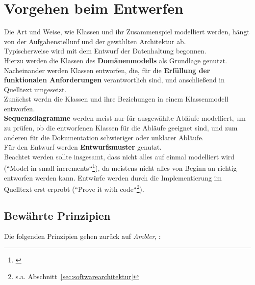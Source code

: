 \section{Vorgehen beim Entwerfen}
Die Art und Weise, wie Klassen und ihr Zusammenspiel modelliert werden, hängt von der Aufgabenstellunf und der gewählten Architektur ab.\\

\noindent
Typischerweise wird mit dem Entwurf der Datenhaltung begonnen.\\
Hierzu werden die Klassen des \textbf{Domänenmodells} als Grundlage genutzt.\\

\noindent
Nacheinander werden Klassen entworfen, die, für die \textbf{Erfüllung der funktionalen Anforderungen} verantwortlich sind, und anschließend in Quelltext umgesetzt.\\

\noindent
Zunächst werdn die Klassen und ihre Beziehungen in einem Klassenmodell entworfen.\\

\noindent
\textbf{Sequenzdiagramme} werden meist nur für ausgewählte Abläufe modelliert, um zu prüfen, ob die entworfenen Klassen für die Abläufe geeignet sind, und zum anderen für die Dokumentation schwieriger oder unklarer Abläufe.\\

\noindent
Für den Entwurf werden \textbf{Entwurfsmuster} genutzt.\\

\noindent
Beachtet werden sollte insgesamt, dass nicht alles auf einmal modelliert wird (``Model in small increments``\footnote{\cite[51]{Wed09b}}), da meistens nicht alles von Beginn an richtig entworfen werden kann.
Entwürfe werden durch die Implementierung im Quelltext erst erprobt (``Prove it with code``\footnote{
    s.a. Abschnitt~\ref{sec:softwarearchitektur}
}).

\subsection*{Bewährte Prinzipien}

Die folgenden Prinzipien gehen zurück auf \textit{Ambler}, \cite[112, Table 4.2. The Supplementary Principles of AM]{Amb04}:

